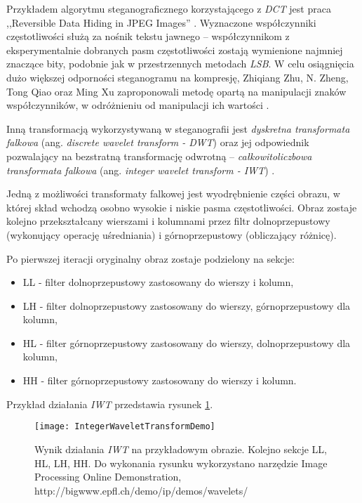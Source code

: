 {{{            %
            Przykładem algorytmu steganograficznego korzystającego z \textit{DCT} jest praca ,,Reversible Data
            Hiding in JPEG Images'' \cite{Huang2016ReversibleDH, Li2007ASM}. Wyznaczone współczynniki częstotliwości
            służą za nośnik tekstu jawnego -- współczynnikom z eksperymentalnie dobranych pasm częstotliwości zostają
            wymienione najmniej znaczące bity, podobnie jak w przestrzennych metodach \textit{LSB}. W celu osiągnięcia
            dużo większej odporności steganogramu na kompresję, Zhiqiang Zhu, N. Zheng, Tong Qiao oraz Ming Xu
            zaproponowali metodę opartą na manipulacji znaków współczynników, w odróżnieniu od manipulacji ich
            wartości \cite{Zhu2019RobustSB}.

            Inną transformacją wykorzystywaną w steganografii jest \textit{dyskretna transformata falkowa} (ang.
            \textit{discrete wavelet transform - DWT}) oraz jej odpowiednik pozwalający na bezstratną transformację
            odwrotną -- \textit{całkowitoliczbowa transformata falkowa} (ang. \textit{integer wavelet transform -
            IWT}) \cite{Xuan2005LosslessDH}.

            Jedną z możliwości transformaty falkowej jest wyodrębnienie części obrazu, w której skład wchodzą osobno
            wysokie i niskie pasma częstotliwości. Obraz zostaje kolejno przekształcany wierszami i kolumnami przez
            filtr dolnoprzepustowy (wykonujący operację uśredniania) i górnoprzepustowy (obliczający różnicę).

            Po pierwszej iteracji oryginalny obraz zostaje podzielony na sekcje:
            \begin{itemize}
                \item LL - filter dolnoprzepustowy zastosowany do wierszy i kolumn,
                \item LH - filter dolnoprzepustowy zastosowany do wierszy, górnoprzepustowy dla kolumn,
                \item HL - filter górnoprzepustowy zastosowany do wierszy, dolnoprzepustowy dla kolumn,
                \item HH - filter górnoprzepustowy zastosowany do wierszy i kolumn.
            \end{itemize}

            Przykład działania \textit{IWT} przedstawia rysunek \ref{fig:iwtdemo}.

            \begin{figure}
                \centering
                \texttt{[image: IntegerWaveletTransformDemo]}
                \caption{Wynik działania \textit{IWT} na przykładowym obrazie. Kolejno sekcje LL, HL, LH, HH. Do wykonania
                    rysunku wykorzystano narzędzie Image Processing Online Demonstration, http://bigwww.epfl.ch/demo/ip/demos/wavelets/}
                \label{fig:iwtdemo}
            \end{figure}


}}}
